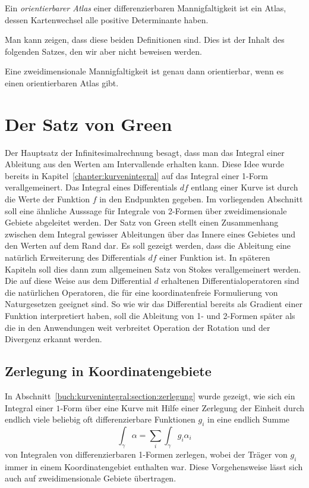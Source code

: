 \begin{definition}
Ein {\em orientierbarer Atlas} einer differenzierbaren Mannigfaltigkeit
ist ein Atlas, dessen Kartenwechsel alle positive Determinante haben.
\end{definition}

Man kann zeigen, dass diese beiden Definitionen sind.
Dies ist der Inhalt des folgenden Satzes, den wir aber nicht
beweisen werden.

\begin{satz}
Eine zweidimensionale Mannigfaltigkeit ist genau dann orientierbar,
wenn es einen orientierbaren Atlas gibt.
\end{satz}


%
%
\section{Der Satz von Green
\label{buch:green:section:green}}
Der Hauptsatz der Infinitesimalrechnung besagt, dass man das Integral
einer Ableitung aus den Werten am Intervallende erhalten kann.
Diese Idee wurde bereits in Kapitel~\ref{chapter:kurvenintegral} auf
das Integral einer 1-Form verallgemeinert.
Das Integral eines Differentials $df$ entlang einer Kurve ist durch
die Werte der Funktion $f$ in den Endpunkten gegeben.
Im vorliegenden Abschnitt soll eine ähnliche Ausssage für Integrale
von 2-Formen über zweidimensionale Gebiete abgeleitet werden.
Der Satz von Green stellt einen Zusammenhang zwischen dem Integral
gewisser Ableitungen über das Innere eines Gebietes und den Werten
auf dem Rand dar.
Es soll gezeigt werden, dass die Ableitung eine natürlich Erweiterung
des Differentials $df$ einer Funktion ist.
In späteren Kapiteln soll dies dann zum allgemeinen Satz von Stokes
verallgemeinert werden.
Die auf diese Weise aus dem Differential $d$ erhaltenen
Differentialoperatoren sind die natürlichen Operatoren, die für
eine koordinatenfreie Formulierung von Naturgesetzen geeignet sind.
So wie wir das Differential bereits als Gradient einer Funktion
interpretiert haben, soll die Ableitung von 1- und 2-Formen später
als die in den Anwendungen weit verbreitet Operation der Rotation
und der Divergenz erkannt werden.

%
%
\subsection{Zerlegung in Koordinatengebiete
\label{buch:green:satzvongreen:subsection:zerlegung}}
In Abschnitt~\ref{buch:kurvenintegral:section:zerlegung} wurde gezeigt,
wie sich ein Integral einer $1$-Form über eine Kurve mit Hilfe einer
Zerlegung der Einheit durch endlich viele beliebig oft differenzierbare
Funktionen $g_i$ in eine endlich Summe
\[
\int_{\gamma} \alpha = \sum_i \int_{\gamma} g_i\alpha_i
\]
von Integralen von differenzierbaren 1-Formen zerlegen, wobei der
Träger von $g_i$ immer in einem Koordinatengebiet enthalten war.
Diese Vorgehensweise lässt sich auch auf zweidimensionale Gebiete
übertragen.

